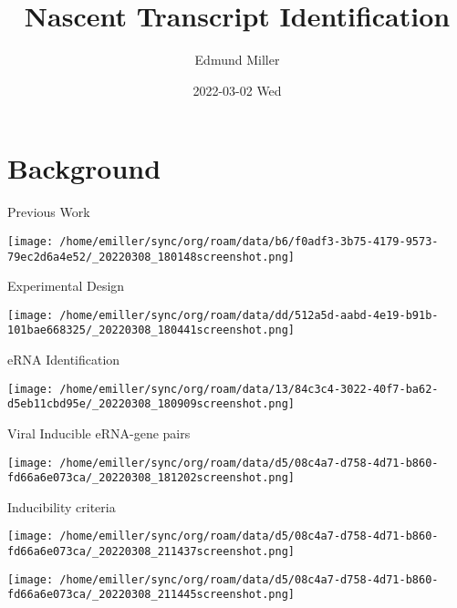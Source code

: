 \documentclass[bigger]{beamer}
\author{Edmund Miller}
\date{2022-03-02 Wed}
\title{Nascent Transcript Identification}
\begin{document}
\maketitle

\section{Background}
\label{sec:org9fc3a76}

\begin{frame}[label={sec:org8343b8c}]{Previous Work}
\begin{center}
\texttt{[image: /home/emiller/sync/org/roam/data/b6/f0adf3-3b75-4179-9573-79ec2d6a4e52/\_20220308\_180148screenshot.png]}
\end{center}
\end{frame}

\begin{frame}[label={sec:orgfc05a77}]{Experimental Design}
\begin{center}
\texttt{[image: /home/emiller/sync/org/roam/data/dd/512a5d-aabd-4e19-b91b-101bae668325/\_20220308\_180441screenshot.png]}
\end{center}
\end{frame}


\begin{frame}[label={sec:org1d680de}]{eRNA Identification}
\begin{center}
\texttt{[image: /home/emiller/sync/org/roam/data/13/84c3c4-3022-40f7-ba62-d5eb11cbd95e/\_20220308\_180909screenshot.png]}
\end{center}
\end{frame}

\begin{frame}[label={sec:orgc6ce2c5}]{Viral Inducible eRNA-gene pairs}
\begin{center}
\texttt{[image: /home/emiller/sync/org/roam/data/d5/08c4a7-d758-4d71-b860-fd66a6e073ca/\_20220308\_181202screenshot.png]}
\end{center}


\begin{block}{Inducibility criteria}
\begin{center}
\texttt{[image: /home/emiller/sync/org/roam/data/d5/08c4a7-d758-4d71-b860-fd66a6e073ca/\_20220308\_211437screenshot.png]}
\end{center}

\begin{center}
\texttt{[image: /home/emiller/sync/org/roam/data/d5/08c4a7-d758-4d71-b860-fd66a6e073ca/\_20220308\_211445screenshot.png]}
\end{center}
\end{block}
\end{frame}
\end{document}
